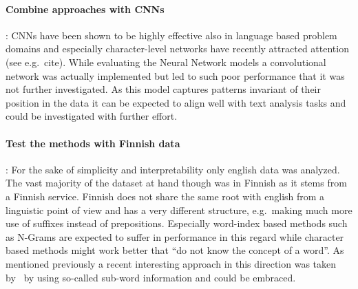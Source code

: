 \paragraph{Combine approaches with \glspl{CNN}}: \glspl{CNN} have been shown to be highly effective also in language based problem domains and especially character-level networks have recently attracted attention (see e.g.~cite{\cite{Zhang:2015aa}}). While evaluating the Neural Network models a convolutional network was actually implemented but led to such poor performance that it was not further investigated. As this model captures patterns invariant of their position in the data it can be expected to align well with text analysis tasks and could be investigated with further effort.
\paragraph{Test the methods with Finnish data}: For the sake of simplicity and interpretability only english data was analyzed. The vast majority of the dataset at hand though was in Finnish as it stems from a Finnish service. Finnish does not share the same root with english from a linguistic point of view and has a very different structure, e.g.\ making much more use of suffixes instead of prepositions. Especially word-index based methods such as N-Grams are expected to suffer in performance in this regard while character based methods might work better that ``do not know the concept of a word''. As mentioned previously a recent interesting approach in this direction was taken by~\cite{Bojanowski:2016aa} by using so-called sub-word information and could be embraced.

%
%
